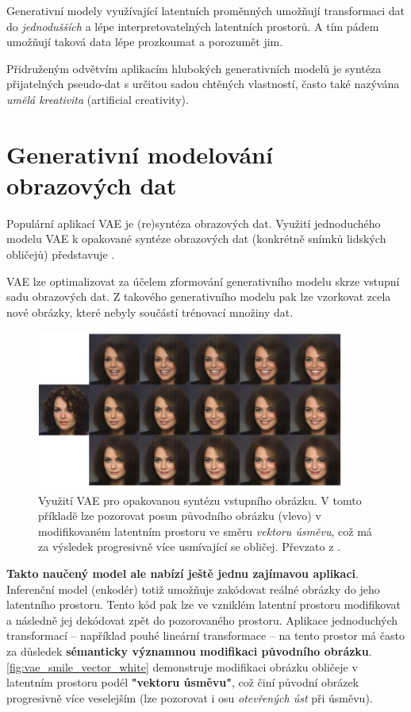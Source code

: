 Generativní modely využívající latentních proměnných umožňují transformaci dat
do \emph{jednodušších} a lépe interpretovatelných latentních prostorů.
A tím pádem umožňují taková data lépe prozkoumat a porozumět jim. \cite{Kingma2019}

Přidruženým odvětvím aplikacím hlubokých generativních modelů je syntéza přijatelných pseudo-dat s určitou sadou chtěných vlastností, často také nazývána \emph{umělá kreativita} (artificial creativity).

\newpage
\section{Generativní modelování obrazových dat}
Populární aplikací VAE je (re)syntéza obrazových dat.
Využití jednoduchého modelu VAE k opakované syntéze obrazových dat (konkrétně snímků lidských obličejů) představuje \cite{White2016}.

VAE lze optimalizovat za účelem zformování generativního modelu skrze vstupní sadu obrazových dat.
Z takového generativního modelu pak lze vzorkovat zcela nové obrázky, které nebyly součástí trénovací množiny dat. \cite{Kingma2019}

\begin{figure}[H]
    \centering
    \includegraphics[width=0.9\textwidth]{figures/applications/vae_smile_vector_white.png}
    \caption{Využití VAE pro opakovanou syntézu vstupního obrázku. V tomto příkladě lze pozorovat posun původního obrázku (vlevo) v modifikovaném latentním prostoru ve směru \emph{vektoru úsměvu}, což má za výsledek progresivně více usmívající se obličej. Převzato z \cite{White2016}.}
    \label{fig:vae_smile_vector_white}
\end{figure}


\textbf{Takto naučený model ale nabízí ještě jednu zajímavou aplikaci}.
Inferenční model (enkodér) totiž umožňuje zakódovat reálné obrázky do jeho latentního prostoru.
Tento kód pak lze ve vzniklém latentní prostoru modifikovat a následně jej dekódovat zpět do pozorovaného prostoru.
Aplikace jednoduchých transformací – například pouhé lineární transformace – na tento prostor má často za důsledek \textbf{sémanticky významnou modifikaci původního obrázku}.
\autoref{fig:vae_smile_vector_white} demonstruje modifikaci obrázku obličeje v latentním prostoru podél \textbf{"vektoru úsměvu"}, což činí původní obrázek progresivně více veselejším (lze pozorovat i osu \emph{otevřených úst} při úsměvu). \cite{Kingma2019}

